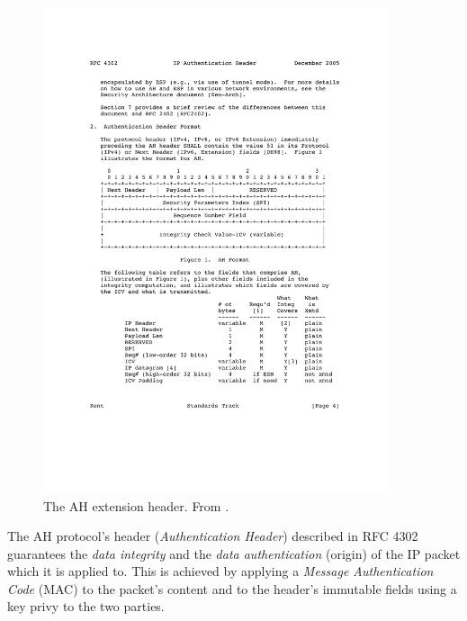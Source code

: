 \documentclass[final,a4paper,twoside,11pt,onecolumn]{report}
\begin{document}
\begin{figure}[h!]

   \includegraphics[width=0.9\textwidth]{ah_nextheader}
   \caption{The AH extension header. From \cite{rfc4302}.}
   \label{fig:wiki-ipsec-ah}

\end{figure}

The AH protocol's header (\emph{Authentication Header}) described in RFC 4302\cite{rfc4302} guarantees the \emph{data integrity} and the \emph{data authentication} (origin) of the IP packet which it is applied to. This is achieved by applying a \emph{Message Authentication Code} (MAC) to the packet's content and to the header's immutable fields using a key privy to the two parties.
\end{document}
